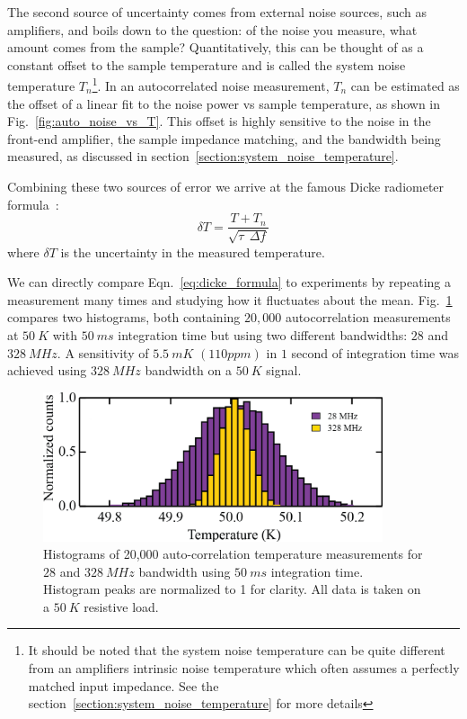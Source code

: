 The second source of uncertainty comes from external noise sources, such as amplifiers, and boils down to the question: of the noise you measure, what amount comes from the sample? Quantitatively, this can be thought of as a constant offset to the sample temperature and is called the system noise temperature $T_n$\footnote{It should be noted that the system noise temperature can be quite different from an amplifiers intrinsic noise temperature which often assumes a perfectly matched input impedance. See the section~\ref{section:system_noise_temperature} for more details}. In an autocorrelated noise measurement, $T_n$ can be estimated as the offset of a linear fit to the noise power vs sample temperature, as shown in Fig.~\ref{fig:auto_noise_vs_T}. This offset is highly sensitive to the noise in the front-end amplifier, the sample impedance matching, and the bandwidth being measured, as discussed in section~\ref{section:system_noise_temperature}.

Combining these two sources of error we arrive at the famous Dicke radiometer formula~\cite{dicke_measurement_1946}:
\begin{equation}\label{eq:dicke_formula}
\delta T = \frac{T+T_n}{\sqrt{\tau~~\Delta f}}
\end{equation}
where $\delta T$ is the uncertainty in the measured temperature.

We can directly compare Eqn.~\ref{eq:dicke_formula} to experiments by repeating a measurement many times and studying how it fluctuates about the mean. Fig.~\ref{fig:JNT_histograms} compares two histograms, both containing $20,000$ autocorrelation measurements at $50~K$ with $50~ms$ integration time but using two different bandwidths: $28$ and $328~MHz$. A sensitivity of $5.5~mK$ $(110 ppm)$ in $1$ second of integration time was achieved using $328~MHz$ bandwidth on a $50~K$ signal.
\begin{figure}
\centering
\includegraphics[width = 100mm]{figures/Johnson_noise_thermometry/histograms.png}
\caption{Histograms of 20,000 auto-correlation temperature measurements for $28$ and $328~MHz$ bandwidth using $50~ms$ integration time. Histogram peaks are normalized to 1 for clarity. All data is taken on a $50~K$ resistive load.}
\label{fig:JNT_histograms}
\end{figure}

